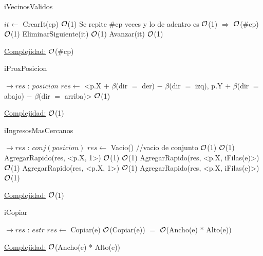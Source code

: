 \begin{Representacion}
\begin{Algoritmos}
	\begin{algorithm}
		\caption{iVecinosValidos}
		\begin{algorithmic}
				\State $it \gets$ CrearIt(cp) \Comment $\mathcal{O}$(1)
				 \Comment Se repite $\#$cp veces y lo de adentro es $\mathcal{O}$(1) $\Rightarrow$ $\mathcal{O}$($\#$cp)
					 \Comment $\mathcal{O}$(1)
						\State EliminarSiguiente(it) \Comment $\mathcal{O}$(1)
					\Else
						\State Avanzar(it) \Comment $\mathcal{O}$(1)
					\EndIf
				\EndWhile
			\EndProcedure		
		\end{algorithmic}
		\underline{Complejidad:} $\mathcal{O}$($\#$cp)
	\end{algorithm}
				
	\begin{algorithm}
		\caption{iProxPosicion}
		\begin{algorithmic}
			 $\to res$ : $posicion$
				\State $res \gets$ <p.X $+$ $\beta$(dir $=$ der) $-$ $\beta$(dir $= $ izq), p.Y $+$ $\beta$(dir $=$ abajo) $-$ $\beta$(dir $=$ arriba)> \Comment $\mathcal{O}$(1)
			\EndProcedure		
		\end{algorithmic}
		\underline{Complejidad:} $\mathcal{O}$(1)
	\end{algorithm}
				
	\begin{algorithm}
		\caption{iIngresosMasCercanos}
		\begin{algorithmic}
			 $\to res$ : $conj(posicion)$
				\State $res \gets$ Vacio() //vacio de conjunto \Comment $\mathcal{O}$(1)
				 \Comment $\mathcal{O}$(1)
					\State AgregarRapido(res, <p.X, 1>) \Comment $\mathcal{O}$(1)
				\Else
					 \Comment $\mathcal{O}$(1)
						\State AgregarRapido(res, <p.X, iFilas(e)>) \Comment $\mathcal{O}$(1)
					\Else
						\State AgregarRapido(res, <p.X, 1>) \Comment $\mathcal{O}$(1)
						\State AgregarRapido(res, <p.X, iFilas(e)>) \Comment $\mathcal{O}$(1)
					\EndIf				
				\EndIf
			\EndProcedure		
		\end{algorithmic}
		\underline{Complejidad:} $\mathcal{O}$(1)
	\end{algorithm}
	
	\begin{algorithm}
		\caption{iCopiar}
		\begin{algorithmic}
			 $\to res$ : $estr$
				\State $res \gets$ Copiar(e) \Comment $\mathcal{O}$(Copiar(e)) $=$ $\mathcal{O}$(Ancho(e) * Alto(e))
			\EndProcedure
		\end{algorithmic}
		\underline{Complejidad:} $\mathcal{O}$(Ancho(e) * Alto(e))
	\end{algorithm}	
	
\end{Algoritmos}
	    
    
\end{Representacion}
